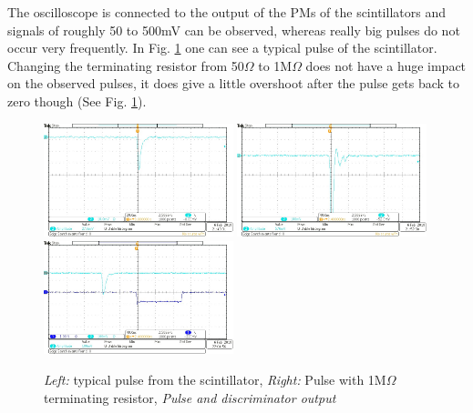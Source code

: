 The oscilloscope is connected to the output of the PMs of the scintillators and signals of roughly 50 to 500mV can be observed, whereas really big pulses do not occur very frequently. In Fig. \ref{Fig_1} one can see a typical pulse of the scintillator. Changing the terminating resistor from 50$\Omega$ to 1M$\Omega$ does not have a huge impact on the observed pulses, it does give a little overshoot after the pulse gets back to zero though (See Fig. \ref{Fig_1}). 
\begin{figure}[H]
    \centering
    \includegraphics[width=0.49\textwidth]{figures/oszi1.jpeg}
    \includegraphics[width=0.49\textwidth]{figures/oszi2.jpeg}
    \includegraphics[width=0.49\textwidth]{figures/oszi3.jpeg}
    \caption{\emph{Left:} typical pulse from the scintillator, \emph{Right:} Pulse with 1M$\Omega$ terminating resistor, \emph{Pulse and discriminator output}}
    \label{Fig_1}
\end{figure}


